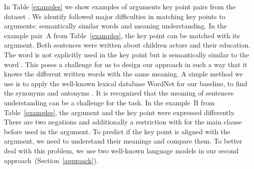 In Table \ref{examples} we show examples of arguments key point pairs from the \ArgKP dataset \cite{Bar-HaimEFKLS2020}. 
We identify followed major difficulties in matching key points to arguments: semantically similar words and meaning understanding.
In the example pair~A from Table~\ref{examples}, the key point can be matched with its argument. Both sentences were written about children actors and their education. The word  is not explicitly used in the key point but is semantically similar to the word . 
This poses a challenge for us to design our approach in such a way that it knows the different written words with the same meaning. 
A simple method we use is to apply the well-known lexical database WordNet for our baseline, to find the synonyms and antonyms \cite{Miller1995}.
It is recognized that the meaning of sentences understanding can be a challenge for the task. In the example~B from Table~\ref{examples}, the argument and the key point were expressed differently. There are two negations  and additionally a restriction with  for the main clause before used in the argument. 
To predict if the key point is aligned with the argument, we need to understand their meanings and compare them. 
To better deal with this problem, we use two well-known language models in our second approach~(Section~\ref{approach}).

